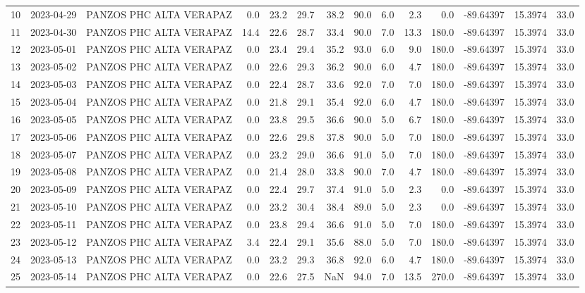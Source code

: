 \documentclass[12pt]{article}
\begin{document}
\begin{center}
\begin{tabular}{lllrrrrrrrrrrr}
10  & 2023-04-29 &  PANZOS PHC ALTA VERAPAZ &     0.0 &  23.2 &   29.7 &  38.2 &     90.0 &  6.0 &         2.3 &         0.0 & -89.64397 &  15.3974 &     33.0 \\
11  & 2023-04-30 &  PANZOS PHC ALTA VERAPAZ &    14.4 &  22.6 &   28.7 &  33.4 &     90.0 &  7.0 &        13.3 &       180.0 & -89.64397 &  15.3974 &     33.0 \\
12  & 2023-05-01 &  PANZOS PHC ALTA VERAPAZ &     0.0 &  23.4 &   29.4 &  35.2 &     93.0 &  6.0 &         9.0 &       180.0 & -89.64397 &  15.3974 &     33.0 \\
13  & 2023-05-02 &  PANZOS PHC ALTA VERAPAZ &     0.0 &  22.6 &   29.3 &  36.2 &     90.0 &  6.0 &         4.7 &       180.0 & -89.64397 &  15.3974 &     33.0 \\
14  & 2023-05-03 &  PANZOS PHC ALTA VERAPAZ &     0.0 &  22.4 &   28.7 &  33.6 &     92.0 &  7.0 &         7.0 &       180.0 & -89.64397 &  15.3974 &     33.0 \\
15  & 2023-05-04 &  PANZOS PHC ALTA VERAPAZ &     0.0 &  21.8 &   29.1 &  35.4 &     92.0 &  6.0 &         4.7 &       180.0 & -89.64397 &  15.3974 &     33.0 \\
16  & 2023-05-05 &  PANZOS PHC ALTA VERAPAZ &     0.0 &  23.8 &   29.5 &  36.6 &     90.0 &  5.0 &         6.7 &       180.0 & -89.64397 &  15.3974 &     33.0 \\
17  & 2023-05-06 &  PANZOS PHC ALTA VERAPAZ &     0.0 &  22.6 &   29.8 &  37.8 &     90.0 &  5.0 &         7.0 &       180.0 & -89.64397 &  15.3974 &     33.0 \\
18  & 2023-05-07 &  PANZOS PHC ALTA VERAPAZ &     0.0 &  23.2 &   29.0 &  36.6 &     91.0 &  5.0 &         7.0 &       180.0 & -89.64397 &  15.3974 &     33.0 \\
19  & 2023-05-08 &  PANZOS PHC ALTA VERAPAZ &     0.0 &  21.4 &   28.0 &  33.8 &     90.0 &  7.0 &         4.7 &       180.0 & -89.64397 &  15.3974 &     33.0 \\
20  & 2023-05-09 &  PANZOS PHC ALTA VERAPAZ &     0.0 &  22.4 &   29.7 &  37.4 &     91.0 &  5.0 &         2.3 &         0.0 & -89.64397 &  15.3974 &     33.0 \\
21  & 2023-05-10 &  PANZOS PHC ALTA VERAPAZ &     0.0 &  23.2 &   30.4 &  38.4 &     89.0 &  5.0 &         2.3 &         0.0 & -89.64397 &  15.3974 &     33.0 \\
22  & 2023-05-11 &  PANZOS PHC ALTA VERAPAZ &     0.0 &  23.8 &   29.4 &  36.6 &     91.0 &  5.0 &         7.0 &       180.0 & -89.64397 &  15.3974 &     33.0 \\
23  & 2023-05-12 &  PANZOS PHC ALTA VERAPAZ &     3.4 &  22.4 &   29.1 &  35.6 &     88.0 &  5.0 &         7.0 &       180.0 & -89.64397 &  15.3974 &     33.0 \\
24  & 2023-05-13 &  PANZOS PHC ALTA VERAPAZ &     0.0 &  23.2 &   29.3 &  36.8 &     92.0 &  6.0 &         4.7 &       180.0 & -89.64397 &  15.3974 &     33.0 \\
25  & 2023-05-14 &  PANZOS PHC ALTA VERAPAZ &     0.0 &  22.6 &   27.5 &   NaN &     94.0 &  7.0 &        13.5 &       270.0 & -89.64397 &  15.3974 &     33.0 \\
\bottomrule
\end{tabular}

        
        \end{center}
        
\end{document}
